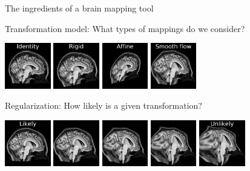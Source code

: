 \documentclass{beamer}
\begin{document}
\begin{frame}{The ingredients of a brain mapping tool}

Transformation model: What types of mappings do we consider?

\includegraphics[width=0.15\textwidth]{ex2_id}
\includegraphics[width=0.15\textwidth]{ex2_rigid}
\includegraphics[width=0.15\textwidth]{ex2_affine}
\includegraphics[width=0.15\textwidth]{ex2_flow}


\vspace{1em}
Regularization: How likely is a given transformation?

\includegraphics[width=0.15\textwidth]{ex2_flow_n_1}
\includegraphics[width=0.15\textwidth]{ex2_flow_n_2}
\includegraphics[width=0.15\textwidth]{ex2_flow_n_3}
\includegraphics[width=0.15\textwidth]{ex2_flow_n_4}
\includegraphics[width=0.15\textwidth]{ex2_flow_n_5}




\end{frame}
\end{document}

